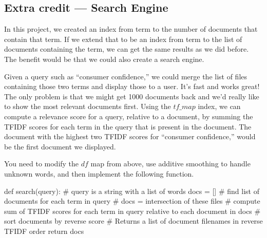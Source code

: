 \begin{fullwidth}
\section{Extra credit --- Search Engine}

In this project, we created an index from term to the number of documents that contain that term. If we extend that to be an index from term to the list of documents containing the term, we can get the same results as we did before. The benefit would be that we could also create a search engine.

Given a query such as ``consumer confidence,'' we could merge the list of files containing those two terms and display those to a user. It's fast and works great! The only problem is that we might get 1000 documents back and we'd really like to show the most relevant documents first.  Using the $tf\_map$ index, we can compute a relevance score for a query, relative to a document, by summing the TFIDF scores for each term in the query that is present in the document. The document with the highest two TFIDF scores for ``consumer confidence,'' would be the first document we displayed.

You need to modify the $df$ map from above, use additive smoothing to handle unknown words, and then implement the following function.

\begin{pyverbatim}
def search(query): # query is a string with a list of words
    docs = []
    # find list of documents for each term in query
    # docs = intersection of these files
    # compute sum of TFIDF scores for each term in query relative to each document in docs
    # sort documents by reverse score
    # Returns a list of document filenames in reverse TFIDF order
    return docs
\end{pyverbatim}

\end{fullwidth}

